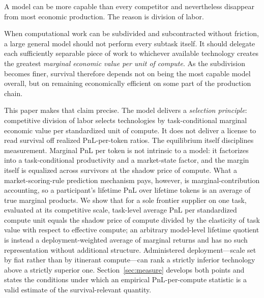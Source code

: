 \documentclass[11pt]{article}
\theoremstyle{definition}
\theoremstyle{remark}
\begin{document}
A model can be more capable than every competitor and nevertheless disappear from most economic production. The reason is division of labor.

When computational work can be subdivided and subcontracted without friction, a large general model should not perform every subtask itself. It should delegate each sufficiently separable piece of work to whichever available technology creates the greatest \emph{marginal economic value per unit of compute}. As the subdivision becomes finer, survival therefore depends not on being the most capable model overall, but on remaining economically efficient on some part of the production chain.

This paper makes that claim precise. The model delivers a \emph{selection principle}: competitive division of labor selects technologies by task-conditional marginal economic value per standardized unit of compute. It does not deliver a license to read survival off realized PnL-per-token ratios. The equilibrium itself disciplines measurement. Marginal PnL per token is not intrinsic to a model: it factorizes into a task-conditional productivity and a market-state factor, and the margin itself is equalized across survivors at the shadow price of compute. What a market-scoring-rule prediction mechanism pays, however, is marginal-contribution accounting, so a participant's lifetime PnL over lifetime tokens is an average of true marginal products. We show that for a sole frontier supplier on one task, evaluated at its competitive scale, task-level average PnL per standardized compute unit equals the shadow price of compute divided by the elasticity of task value with respect to effective compute; an arbitrary model-level lifetime quotient is instead a deployment-weighted average of marginal returns and has no such representation without additional structure. Administered deployment---scale set by fiat rather than by itinerant compute---can rank a strictly inferior technology above a strictly superior one. Section~\ref{sec:measure} develops both points and states the conditions under which an empirical PnL-per-compute statistic is a valid estimate of the survival-relevant quantity.
\end{document}
